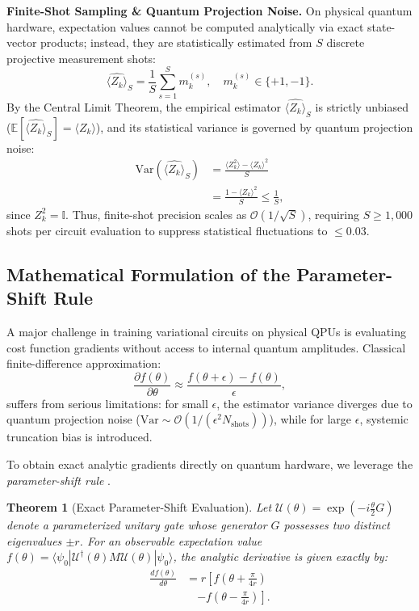 \documentclass[pdflatex,sn-mathphys-num]{sn-jnl}%
\theoremstyle{thmstyleone}%
\newtheorem{theorem}{Theorem}%
\theoremstyle{thmstyletwo}%
\theoremstyle{thmstylethree}%
\begin{document}
\textbf{Finite-Shot Sampling \& Quantum Projection Noise.} On physical quantum hardware, expectation values cannot be computed analytically via exact state-vector products; instead, they are statistically estimated from $S$ discrete projective measurement shots:
\begin{equation}
\widehat{\langle Z_k \rangle}_S = \frac{1}{S} \sum_{s=1}^S m_k^{(s)}, \quad m_k^{(s)} \in \{+1, -1\}.
\label{eq:shot_estimator}
\end{equation}
By the Central Limit Theorem, the empirical estimator $\widehat{\langle Z_k \rangle}_S$ is strictly unbiased ($\mathbb{E}[\widehat{\langle Z_k \rangle}_S] = \langle Z_k \rangle$), and its statistical variance is governed by quantum projection noise:
\begin{align}
\mathrm{Var}\left(\widehat{\langle Z_k \rangle}_S\right) &= \frac{\langle Z_k^2 \rangle - \langle Z_k \rangle^2}{S} \nonumber \\
&= \frac{1 - \langle Z_k \rangle^2}{S} \le \frac{1}{S},
\label{eq:shot_noise_variance}
\end{align}
since $Z_k^2 = \mathbb{I}$. Thus, finite-shot precision scales as $\mathcal{O}(1/\sqrt{S})$, requiring $S \ge 1{,}000$ shots per circuit evaluation to suppress statistical fluctuations to $\le 0.03$.

\subsection{Mathematical Formulation of the Parameter-Shift Rule}
A major challenge in training variational circuits on physical QPUs is evaluating cost function gradients without access to internal quantum amplitudes. Classical finite-difference approximation:
\begin{equation}
\frac{\partial f(\theta)}{\partial \theta} \approx \frac{f(\theta + \epsilon) - f(\theta)}{\epsilon},
\label{eq:finite_difference}
\end{equation}
suffers from serious limitations: for small $\epsilon$, the estimator variance diverges due to quantum projection noise ($\mathrm{Var} \sim \mathcal{O}(1/(\epsilon^2 N_{\mathrm{shots}}))$), while for large $\epsilon$, systemic truncation bias is introduced.

To obtain exact analytic gradients directly on quantum hardware, we leverage the \textit{parameter-shift rule} \cite{mitarai2018quantum, schuld2019evaluating}.

\begin{theorem}[Exact Parameter-Shift Evaluation]
Let $\mathcal{U}(\theta) = \exp(-i \frac{\theta}{2} G)$ denote a parameterized unitary gate whose generator $G$ possesses two distinct eigenvalues $\pm r$. For an observable expectation value $f(\theta) = \langle \psi_0 | \mathcal{U}^\dagger(\theta) M \mathcal{U}(\theta) | \psi_0 \rangle$, the analytic derivative is given exactly by:
\begin{align}
\frac{d f(\theta)}{d\theta} &= r \left[ f\left(\theta + \frac{\pi}{4r}\right) \right. \nonumber \\
&\quad \left. - f\left(\theta - \frac{\pi}{4r}\right) \right].
\label{eq:param_shift_theorem}
\end{align}
\end{theorem}
\end{document}
